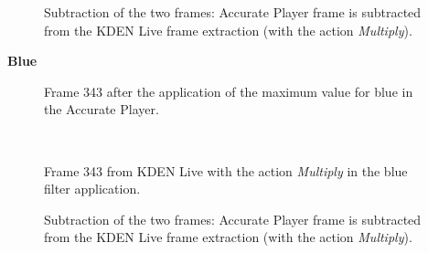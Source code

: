 \documentclass[../MasterThesis.tex]{subfiles}
\begin{document}
\vspace*{-1em}

\begin{figure}[H]
	\begin{center}
		\caption[]{\small Subtraction of the two frames: Accurate Player frame is subtracted from the KDEN Live frame extraction (with the action \textit{Multiply}).}
	\end{center}
\end{figure}


\vspace*{-1em}

\textbf{Blue}

\vspace*{-1em}


\begin{minipage}{0.48\textwidth}
	\begin{figure}[H]
		\begin{center}
			\caption[]{\small Frame 343 after the application of the maximum value for blue in the Accurate Player.}
		\end{center}
	\end{figure}
\end{minipage}\begin{minipage}{0.04\textwidth}
	\ 
\end{minipage}\begin{minipage}{0.48\textwidth}
	\begin{figure}[H]
		\begin{center}
			\caption[]{\small Frame 343 from KDEN Live with the action \textit{Multiply} in the blue filter application.}
		\end{center}
	\end{figure}
\end{minipage}

\vspace*{-1em}

\begin{figure}[H]
	\begin{center}
		\caption[]{\small Subtraction of the two frames: Accurate Player frame is subtracted from the KDEN Live frame extraction (with the action \textit{Multiply}).}
	\end{center}
\end{figure}
\end{document}

